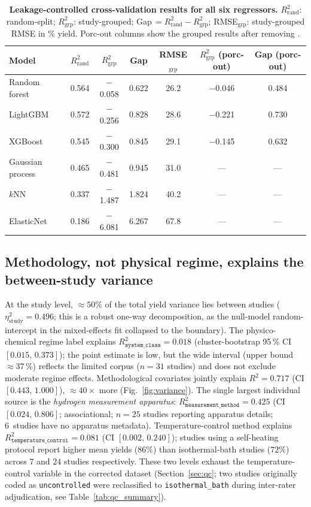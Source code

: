 \begin{table}[tbp]
\centering
\caption{\textbf{Leakage-controlled cross-validation results for all six regressors.}
$R^2_{\text{rand}}$: random-split; $R^2_{\text{grp}}$: study-grouped;
Gap\,$= R^2_{\text{rand}} - R^2_{\text{grp}}$;
RMSE$_{\text{grp}}$: study-grouped RMSE in \% yield.
Porc-out columns show the grouped results after removing \citeauthor{porciuncula2012}.}
\label{tab:cv_summary}
\begin{tabular}{lcccccc}
\hline
Model & $R^2_{\text{rand}}$ & $R^2_{\text{grp}}$ & Gap & RMSE$_{\text{grp}}$ & $R^2_{\text{grp}}$ (porc-out) & Gap (porc-out) \\
\hline
Random forest   & 0.564 & $-$0.058 & 0.622 & 26.2 & $-$0.046 & 0.484 \\
LightGBM        & 0.572 & $-$0.256 & 0.828 & 28.6 & $-$0.221 & 0.730 \\
XGBoost         & 0.545 & $-$0.300 & 0.845 & 29.1 & $-$0.145 & 0.632 \\
Gaussian process& 0.465 & $-$0.481 & 0.945 & 31.0 & ---       & ---   \\
$k$NN           & 0.337 & $-$1.487 & 1.824 & 40.2 & ---       & ---   \\
ElasticNet      & 0.186 & $-$6.081 & 6.267 & 67.8 & ---       & ---   \\
\hline
\end{tabular}
\end{table}

\subsection{Methodology, not physical regime, explains the between-study variance}
\label{sec:variance_results}

At the study level, $\approx\!50\%$ of the total yield variance lies between studies
($\eta^2_{\text{study}}\!=\!0.496$; this is a robust one-way decomposition, as the
null-model random-intercept in the mixed-effects fit collapsed to the boundary). The
physico-chemical regime label explains $R^2_{\texttt{system\_class}}\!=\!0.018$
(cluster-bootstrap 95\,\% CI $[0.015,\,0.373]$); the point estimate is low, but the
wide interval (upper bound $\approx\!37\,\%$) reflects the limited corpus ($n\!=\!31$
studies) and does not exclude moderate regime effects.
Methodological covariates jointly explain $R^2\!=\!0.717$ (CI $[0.443,\,1.000]$),
$\approx\!40\times$ more (Fig.~\ref{fig:variance}). The single largest individual source is the
\emph{hydrogen measurement apparatus}: $R^2_{\texttt{measurement\_method}}\!=\!0.425$
(CI $[0.024,\,0.806]$; associational; $n\!=\!25$ studies reporting apparatus details;
6~studies have no apparatus metadata). Temperature-control method explains
$R^2_{\texttt{temperature\_control}}\!=\!0.081$ (CI $[0.002,\,0.240]$);
studies using a self-heating protocol report higher mean yields
($86\%$) than isothermal-bath studies ($72\%$) across $7$ and $24$ studies respectively.
These two levels exhaust the temperature-control variable in the corrected dataset
(Section~\ref{sec:qc}; two studies originally coded as \texttt{uncontrolled} were
reclassified to \texttt{isothermal\_bath} during inter-rater adjudication, see Table~\ref{tab:qc_summary}).

